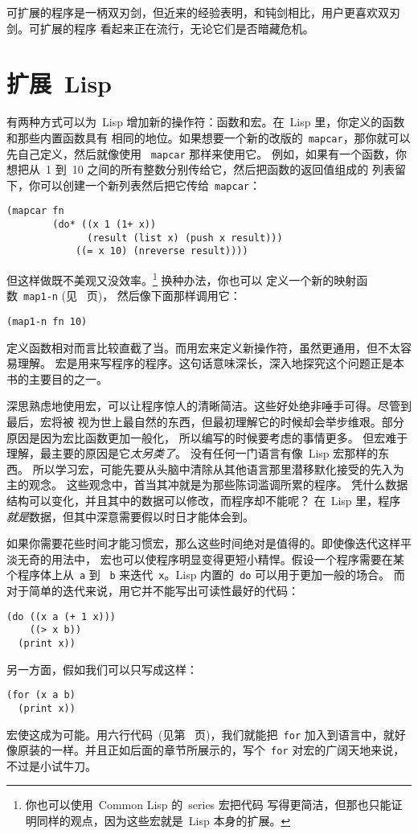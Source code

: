 可扩展的程序是一柄双刃剑，但近来的经验表明，和钝剑相比，用户更喜欢双刃剑。可扩展的程序
看起来正在流行，无论它们是否暗藏危机。

\section{扩展~Lisp}
\label{sec:extending_lisp}

有两种方式可以为~Lisp 增加新的操作符：函数和宏。在~Lisp 里，你定义的函数和那些内置函数具有
相同的地位。如果想要一个新的改版的~\verb|mapcar|，那你就可以先自己定义，然后就像使用
~\texttt{mapcar} 那样来使用它。
例如，如果有一个函数，你想把从~1 到~10 之间的所有整数分别传给它，然后把函数的返回值组成的
列表留下，你可以创建一个新列表然后把它传给~\texttt{mapcar}：
\begin{lstlisting}
(mapcar fn
        (do* ((x 1 (1+ x))
              (result (list x) (push x result)))
            ((= x 10) (nreverse result))))
\end{lstlisting}
但这样做既不美观又没效率。\footnote{你也可以使用~Common Lisp 的~series 宏把代码
写得更简洁，但那也只能证明同样的观点，因为这些宏就是~Lisp 本身的扩展。}
换种办法，你也可以
定义一个新的映射函数~\texttt{map1-n} (见~\pageref{fig:mapping_functions} 页)，
然后像下面那样调用它：
\begin{lstlisting}
(map1-n fn 10)
\end{lstlisting}
定义函数相对而言比较直截了当。而用宏来定义新操作符，虽然更通用，但不太容易理解。
宏是用来写程序的程序。这句话意味深长，深入地探究这个问题正是本书的主要目的之一。

深思熟虑地使用宏，可以让程序惊人的清晰简洁。这些好处绝非唾手可得。尽管到最后，宏将被
视为世上最自然的东西，但最初理解它的时候却会举步维艰。部分原因是因为宏比函数更加一般化，
所以编写的时候要考虑的事情更多。
但宏难于理解，最主要的原因是它\emph{太另类了}。
没有任何一门语言有像~Lisp 宏那样的东西。
所以学习宏，可能先要从头脑中清除从其他语言那里潜移默化接受的先入为主的观念。
这些观念中，首当其冲就是为那些陈词滥调所累的程序。
凭什么数据结构可以变化，并且其中的数据可以修改，而程序却不能呢？
在~Lisp 里，程序\emph{就是}数据，但其中深意需要假以时日才能体会到。

如果你需要花些时间才能习惯宏，那么这些时间绝对是值得的。即使像迭代这样平淡无奇的用法中，
宏也可以使程序明显变得更短小精悍。假设一个程序需要在某个程序体上从~\verb|a| 到
~\verb|b| 来迭代~\verb|x|。Lisp 内置的~\verb|do| 可以用于更加一般的场合。
而对于简单的迭代来说，用它并不能写出可读性最好的代码：
\begin{lstlisting}
(do ((x a (+ 1 x)))
    ((> x b))
  (print x))
\end{lstlisting}
另一方面，假如我们可以只写成这样：
\begin{lstlisting}
(for (x a b)
  (print x))
\end{lstlisting}
宏使这成为可能。用六行代码~(见第~\pageref{fig:simple_iteration_macros} 页)，我们就能把~\verb|for| 加入到语言中，就好像原装的一样。并且正如后面的章节所展示的，写个~\verb|for| 对宏的广阔天地来说，不过是小试牛刀。

